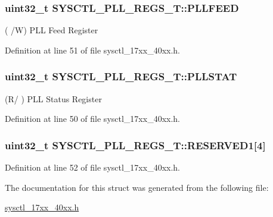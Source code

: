\subsubsection[{\texorpdfstring{P\+L\+L\+F\+E\+ED}{PLLFEED}}]{ uint32\+\_\+t S\+Y\+S\+C\+T\+L\+\_\+\+P\+L\+L\+\_\+\+R\+E\+G\+S\+\_\+\+T\+::\+P\+L\+L\+F\+E\+ED}\hypertarget{structSYSCTL__PLL__REGS__T_a658116aa66b1d9e27f12cf0e429663f7}{}\label{structSYSCTL__PLL__REGS__T_a658116aa66b1d9e27f12cf0e429663f7}
( /W) P\+LL Feed Register 

Definition at line 51 of file sysctl\+\_\+17xx\+\_\+40xx.\+h.

\subsubsection[{\texorpdfstring{P\+L\+L\+S\+T\+AT}{PLLSTAT}}]{ uint32\+\_\+t S\+Y\+S\+C\+T\+L\+\_\+\+P\+L\+L\+\_\+\+R\+E\+G\+S\+\_\+\+T\+::\+P\+L\+L\+S\+T\+AT}\hypertarget{structSYSCTL__PLL__REGS__T_a9cc1486fbc5a9888ccdd70df2b57ebec}{}\label{structSYSCTL__PLL__REGS__T_a9cc1486fbc5a9888ccdd70df2b57ebec}
(R/ ) P\+LL Status Register 

Definition at line 50 of file sysctl\+\_\+17xx\+\_\+40xx.\+h.

\subsubsection[{\texorpdfstring{R\+E\+S\+E\+R\+V\+E\+D1}{RESERVED1}}]{\setlength{\rightskip}{0pt plus 5cm}uint32\+\_\+t S\+Y\+S\+C\+T\+L\+\_\+\+P\+L\+L\+\_\+\+R\+E\+G\+S\+\_\+\+T\+::\+R\+E\+S\+E\+R\+V\+E\+D1\mbox{[}4\mbox{]}}\hypertarget{structSYSCTL__PLL__REGS__T_a8f564110c46a5fba4e6d306cd4137bd3}{}\label{structSYSCTL__PLL__REGS__T_a8f564110c46a5fba4e6d306cd4137bd3}


Definition at line 52 of file sysctl\+\_\+17xx\+\_\+40xx.\+h.



The documentation for this struct was generated from the following file\+:\begin{DoxyCompactItemize}
\item 
\hyperlink{sysctl__17xx__40xx_8h}{sysctl\+\_\+17xx\+\_\+40xx.\+h}\end{DoxyCompactItemize}
